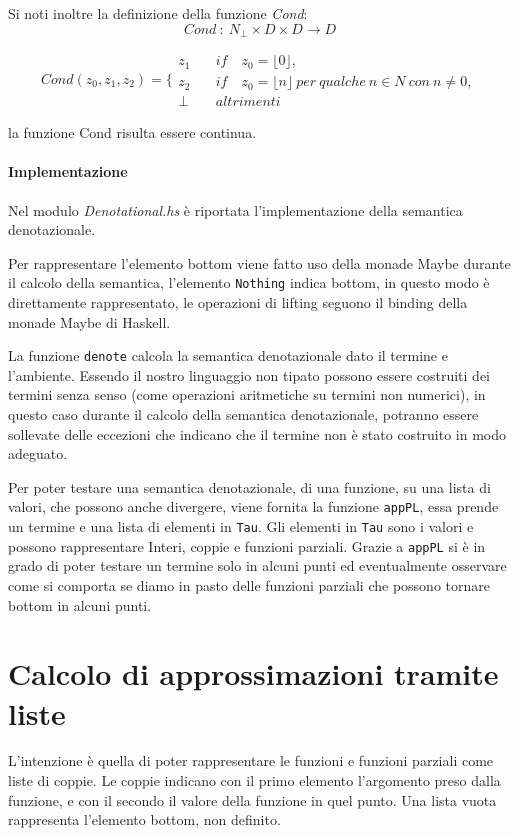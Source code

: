 \documentclass{article}
\begin{document}
Si noti inoltre la definizione della funzione \emph{Cond}:
$$
Cond\ :\ N_{\perp} \times D \times D \rightarrow D
$$

\begin{equation*}
\left.
Cond (z_{0},z_{1},z_{2}) =
\right.\Bigg\{
\begin{aligned}
z_{1} \quad & if \quad z_{0} = \lfloor 0 \rfloor,
\\
z_{2} \quad & if \quad z_{0} = \lfloor n \rfloor \ per \ qualche\ n\in N \ con\ n \neq 0,
\\
\perp \quad & altrimenti 
\end{aligned}
\end{equation*}

la funzione Cond risulta essere continua.

\paragraph{Implementazione}
Nel modulo \emph{Denotational.hs} è riportata l'implementazione della semantica denotazionale.

Per rappresentare l'elemento bottom viene fatto uso della monade Maybe durante il calcolo della semantica, l'elemento \texttt{Nothing} indica bottom, in questo modo è direttamente rappresentato, le operazioni di lifting seguono il binding della monade Maybe di Haskell.

La funzione \texttt{denote} calcola la semantica denotazionale dato il termine e l'ambiente. Essendo il nostro linguaggio non tipato possono essere costruiti dei termini senza senso (come operazioni aritmetiche su termini non numerici), in questo caso durante il calcolo della semantica denotazionale, potranno essere sollevate delle eccezioni che indicano che il termine non è stato costruito in modo adeguato.

Per poter testare una semantica denotazionale, di una funzione, su una lista di valori, che possono anche divergere, viene fornita la funzione \texttt{appPL}, essa prende un termine e una lista di elementi in \texttt{Tau}. Gli elementi in \texttt{Tau} sono i valori e possono rappresentare Interi, coppie e funzioni parziali.
Grazie a \texttt{appPL} si è in grado di poter testare un termine solo in alcuni punti ed eventualmente osservare come si comporta se diamo in pasto delle funzioni parziali che possono tornare bottom in alcuni punti.


\section{Calcolo di approssimazioni tramite liste}
\label{sec:approximations}
L'intenzione è quella di poter rappresentare le funzioni e funzioni parziali come liste di coppie. Le coppie indicano con il primo elemento l'argomento preso dalla funzione, e con il secondo il valore della funzione in quel punto. Una lista vuota rappresenta l'elemento bottom, non definito.
\end{document}

